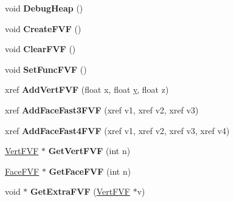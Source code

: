 \begin{DoxyCompactItemize}
\item 
\hypertarget{class_mesh_afb755e00d8d2039c0b4d01b0ae0cc7ae}{void {\bfseries Debug\+Heap} ()}\label{class_mesh_afb755e00d8d2039c0b4d01b0ae0cc7ae}

\item 
\hypertarget{class_mesh_a22e2c270554175a200c15e9bda1c7bb1}{void {\bfseries Create\+F\+V\+F} ()}\label{class_mesh_a22e2c270554175a200c15e9bda1c7bb1}

\item 
\hypertarget{class_mesh_a355612cf899324d11eebb2624fc3105f}{void {\bfseries Clear\+F\+V\+F} ()}\label{class_mesh_a355612cf899324d11eebb2624fc3105f}

\item 
\hypertarget{class_mesh_aad9d9be9fba6f57c3afe869c355b2f42}{void {\bfseries Set\+Func\+F\+V\+F} ()}\label{class_mesh_aad9d9be9fba6f57c3afe869c355b2f42}

\item 
\hypertarget{class_mesh_a6cdce75e8a8dd191b4feecb59ac55984}{xref {\bfseries Add\+Vert\+F\+V\+F} (float x, float \hyperlink{_ice_utils_8h_aa7ffaed69623192258fb8679569ff9ba}{y}, float z)}\label{class_mesh_a6cdce75e8a8dd191b4feecb59ac55984}

\item 
\hypertarget{class_mesh_a6118ceaf7ad8f4bdfbda4581e7cfaf4e}{xref {\bfseries Add\+Face\+Fast3\+F\+V\+F} (xref v1, xref v2, xref v3)}\label{class_mesh_a6118ceaf7ad8f4bdfbda4581e7cfaf4e}

\item 
\hypertarget{class_mesh_a3c7a8966e68df117294e72efd1757206}{xref {\bfseries Add\+Face\+Fast4\+F\+V\+F} (xref v1, xref v2, xref v3, xref v4)}\label{class_mesh_a3c7a8966e68df117294e72efd1757206}

\item 
\hypertarget{class_mesh_a12bd6418129840c0e93fa769c8de9e92}{\hyperlink{struct_vert_f_v_f}{Vert\+F\+V\+F} $\ast$ {\bfseries Get\+Vert\+F\+V\+F} (int n)}\label{class_mesh_a12bd6418129840c0e93fa769c8de9e92}

\item 
\hypertarget{class_mesh_a6e4f2e9d9d6f42cc2bd8e171eae9522f}{\hyperlink{struct_face_f_v_f}{Face\+F\+V\+F} $\ast$ {\bfseries Get\+Face\+F\+V\+F} (int n)}\label{class_mesh_a6e4f2e9d9d6f42cc2bd8e171eae9522f}

\item 
\hypertarget{class_mesh_a0bd815700423dccf20288ed800e1a8c3}{void $\ast$ {\bfseries Get\+Extra\+F\+V\+F} (\hyperlink{struct_vert_f_v_f}{Vert\+F\+V\+F} $\ast$v)}\label{class_mesh_a0bd815700423dccf20288ed800e1a8c3}


\end{DoxyCompactItemize}
